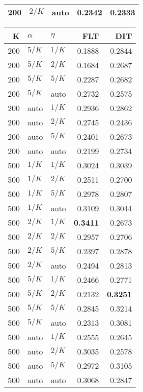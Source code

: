 \begin{table}
\begin{spacing}{1.2}
{\begin{tabular}{rll|rr}
 200 &  $2/K$ &   auto &           0.2342 & 0.2333 \\
\bottomrule
\end{tabular}
} \hfill \parbox{.45\linewidth}{\centering \begin{tabular}{rll|rr}
\toprule
   K &  $\alpha$ &    $\eta$ & FLT &       DIT \\
\midrule
 200 &  $5/K$ &  $1/K$ &           0.1888 &       0.2844 \\
 200 &  $5/K$ &  $2/K$ &           0.1684 &       0.2687 \\
 200 &  $5/K$ &  $5/K$ &           0.2287 &       0.2682 \\
 200 &  $5/K$ &   auto &           0.2732 &       0.2575 \\
 200 &   auto &  $1/K$ &           0.2936 &       0.2862 \\
 200 &   auto &  $2/K$ &           0.2745 &       0.2436 \\
 200 &   auto &  $5/K$ &           0.2401 &       0.2673 \\
 200 &   auto &   auto &           0.2199 &       0.2734 \\
 500 &  $1/K$ &  $1/K$ &           0.3024 &       0.3039 \\
 500 &  $1/K$ &  $2/K$ &           0.2511 &       0.2700 \\
 500 &  $1/K$ &  $5/K$ &           0.2978 &       0.2807 \\
 500 &  $1/K$ &   auto &           0.3109 &       0.3044 \\
 500 &  $2/K$ &  $1/K$ &     {\bf 0.3411} &       0.2673 \\
 500 &  $2/K$ &  $2/K$ &           0.2957 &       0.2706 \\
 500 &  $2/K$ &  $5/K$ &           0.2397 &       0.2878 \\
 500 &  $2/K$ &   auto &           0.2494 &       0.2813 \\
 500 &  $5/K$ &  $1/K$ &           0.2466 &       0.2771 \\
 500 &  $5/K$ &  $2/K$ &           0.2132 & {\bf 0.3251} \\
 500 &  $5/K$ &  $5/K$ &           0.2845 &       0.3214 \\
 500 &  $5/K$ &   auto &           0.2313 &       0.3081 \\
 500 &   auto &  $1/K$ &           0.2555 &       0.2645 \\
 500 &   auto &  $2/K$ &           0.3035 &       0.2578 \\
 500 &   auto &  $5/K$ &           0.2972 &       0.3105 \\
 500 &   auto &   auto &           0.3068 &       0.2847 \\
\bottomrule
\end{tabular}
}
\end{spacing}
\end{table}
